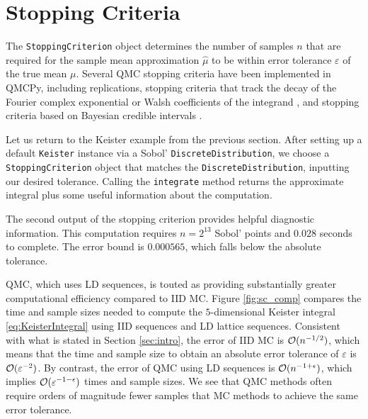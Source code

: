 \documentclass[graybox,footinfo]{svmult}
\newcommand{\hmu}{\widehat{\mu}}
\begin{document}
\section{Stopping Criteria} \label{sec:stopping_crit}

The \texttt{StoppingCriterion} object determines the number of samples $n$ that are required for the sample mean approximation $\hmu$ to be within error tolerance $\varepsilon$ of the true mean $\mu$.  Several QMC stopping criteria have been implemented in QMCPy, including replications, stopping criteria that track the decay of the Fourier complex exponential or Walsh coefficients of the integrand \cite{HicJim16a,HicEtal17a,JimHic16a}, and stopping criteria based on Bayesian credible intervals \cite{RatHic19a,JagHic22a}.

Let us return to the Keister example from the previous section.  After setting up  a default \texttt{Keister} instance via a Sobol' \texttt{DiscreteDistribution}, we choose a \texttt{StoppingCriterion} object that matches the \texttt{DiscreteDistribution}, inputting our desired tolerance.  Calling the  \texttt{integrate} method returns the approximate integral plus some useful information about the computation.

The second output of the stopping criterion provides helpful diagnostic information.  This computation requires $n=2^{13}$ Sobol' points and $0.028$ seconds to complete.  The error bound is $0.000565$, which falls below the absolute tolerance.

QMC, which uses LD sequences, is touted as providing substantially greater computational efficiency compared to IID MC.
Figure \ref{fig:sc_comp} compares the time and sample sizes needed to compute the $5$-dimensional Keister integral \eqref{eq:KeisterIntegral} using IID sequences and LD lattice sequences. Consistent with what is stated in Section \ref{sec:intro}, the error of IID MC is ${\mathcal{O}}(n^{-1/2})$, which means that the time and sample size to obtain an absolute error tolerance of $\varepsilon$ is ${\mathcal{O}}(\varepsilon^{-2})$.  By contrast, the  error of QMC using LD sequences is ${\mathcal{O}}(n^{-1+\epsilon})$, which implies ${\mathcal{O}}(\varepsilon^{-1-\epsilon})$ times and sample sizes.  We see that QMC methods often require orders of magnitude fewer samples that MC methods to achieve the same error tolerance.
\end{document}
